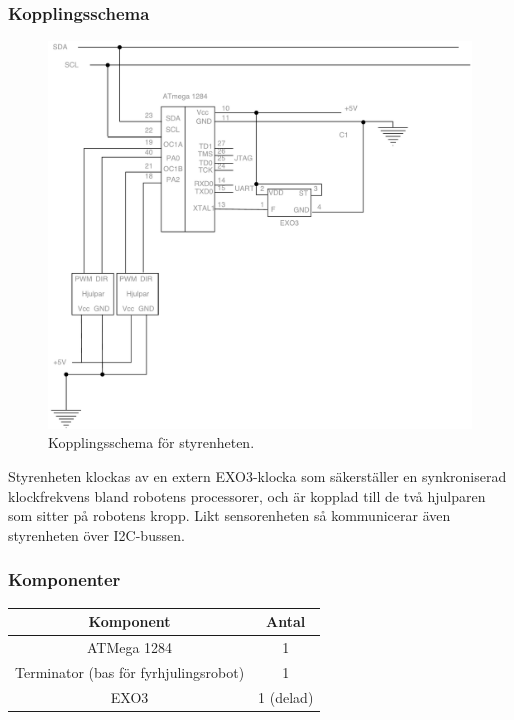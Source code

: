 \documentclass{article}
\begin{document}
\subsubsection{Kopplingsschema}
\begin{figure}[H]
\centering
\includegraphics[scale=0.45]{Styrenhet_kopplingsschema}
\caption{Kopplingsschema för styrenheten.}
\label{fig:styrenhet_kopplingsschema}
\end{figure}

Styrenheten klockas av en extern EXO3-klocka som säkerställer en synkroniserad klockfrekvens bland robotens processorer, och är kopplad till de två hjulparen som sitter på robotens kropp. Likt sensorenheten så kommunicerar även styrenheten över I2C-bussen.

\subsubsection{Komponenter}

\begin{table}[H]
  \centering
  \begin{tabular}{ | c | c |}
    \hline
    \textbf{Komponent} & \textbf{Antal} \\
    \hline
    ATMega 1284 & 1 \\
    \hline
    Terminator (bas för fyrhjulingsrobot) & 1 \\
    \hline
    EXO3 & 1 (delad) \\
    \hline
  \end{tabular}
\end{table}
\end{document}
